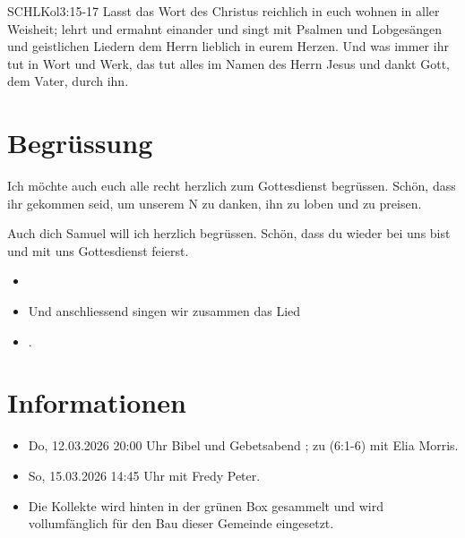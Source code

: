 \documentclass[14pt]{../../inc/mybib}
\newcommand{\Name}{Samuel}
\begin{document}
\begin{bibelbox}{SCHL}{Kol}{3:15-17}
    Lasst das Wort des Christus reichlich in euch wohnen in aller Weisheit; lehrt und ermahnt einander und singt mit Psalmen und Lobgesängen und geistlichen Liedern dem Herrn lieblich in eurem Herzen. Und was immer ihr tut in Wort und Werk, das tut alles im Namen des Herrn Jesus und dankt Gott, dem Vater, durch ihn.
\end{bibelbox}
\section{Begrüssung}
Ich möchte auch euch alle recht herzlich zum Gottesdienst begrüssen. Schön, dass ihr gekommen seid, um unserem \herr N zu danken, ihn zu loben und zu preisen.

Auch dich \Name{} will ich herzlich begrüssen. Schön, dass du wieder bei uns bist und mit uns Gottesdienst feierst.
\begin{itemize}
    \item[] \beten{}
    \item[] Und anschliessend singen wir zusammen das Lied
    \item[] .
\end{itemize}

\section{Informationen}
\begin{itemize}
    \item {} Do, 12.03.2026 20:00 Uhr Bibel und Gebetsabend ; zu (6:1-6) mit Elia Morris.
    \item {} So, 15.03.2026 14:45 Uhr mit Fredy Peter.
    \item {} Die Kollekte wird hinten in der grünen Box gesammelt und wird vollumfänglich für den Bau dieser Gemeinde eingesetzt.
\end{itemize}
\end{document}
